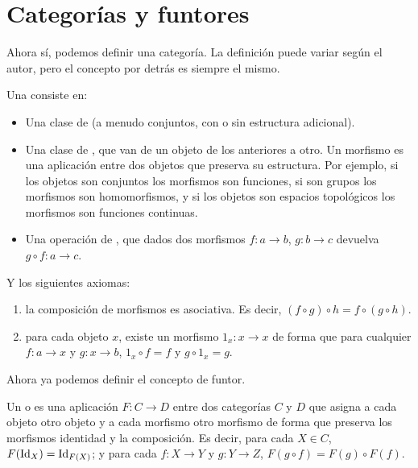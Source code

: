 \section{Categorías y funtores}

Ahora sí, podemos definir una categoría. La definición puede variar según el autor, pero el concepto por detrás es siempre el mismo.

\begin{defi}[Categoría]
\label{funt_defi_categoria}

Una  consiste en:

\begin{itemize}
\item Una clase de  (a menudo conjuntos, con o sin estructura adicional).
\item Una clase de , que van de un objeto de los anteriores a otro. Un morfismo es una aplicación entre dos objetos que preserva su estructura. Por ejemplo, si los objetos son conjuntos los morfismos son funciones, si son grupos los morfismos son homomorfismos, y si los objetos son espacios topológicos los morfismos son funciones continuas.
\item Una operación de , que dados dos morfismos $f:a\to b$, $g:b\to c$ devuelva $g\circ f:a\to c$.
\end{itemize}

Y los siguientes axiomas:
\begin{enumerate}[label=\Roman*]
\item {} la composición de morfismos es asociativa. Es decir, $(f\circ g)\circ h=f\circ(g\circ h)$.
\item {} para cada objeto $x$, existe un morfismo $1_x:x\to x$ de forma que para cualquier $f:a\to x$ y $g:x\to b$, $1_x\circ f=f$ y $g\circ 1_x=g$.
\end{enumerate}
\end{defi}

Ahora ya podemos definir el concepto de funtor.

\begin{defi}[Funtor]
\label{funt_defi_funtor}

Un  o  es una aplicación $F:C\to D$ entre dos categorías $C$ y $D$ que asigna a cada objeto otro objeto y a cada morfismo otro morfismo de forma que preserva los morfismos identidad y la composición. Es decir, para cada $X\in C$, $F(\operatorname{Id}_X)=\operatorname{Id}_{F(X)}$; y para cada $f:X\to Y$ y $g:Y\to Z$, $F(g\circ f)=F(g)\circ F(f)$.
\end{defi}

